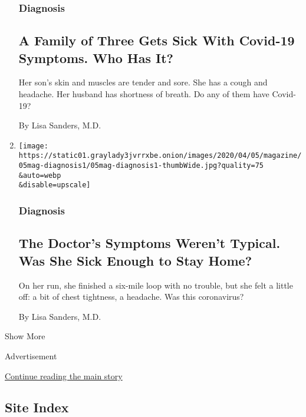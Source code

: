 \begin{enumerate}
{  \subsubsection{Diagnosis}\label{diagnosis-8}}

  \hypertarget{a-family-of-three-gets-sick-with-covid-19-symptoms-who-has-it}{%
  \subsection{A Family of Three Gets Sick With Covid-19 Symptoms. Who
  Has
  It?}\label{a-family-of-three-gets-sick-with-covid-19-symptoms-who-has-it}}

  Her son's skin and muscles are tender and sore. She has a cough and
  headache. Her husband has shortness of breath. Do any of them have
  Covid-19?

  By Lisa Sanders, M.D.
\item
  \href{/2020/03/30/magazine/covid-19-symptoms-doctor.html}{}

  \texttt{[image: https://static01.graylady3jvrrxbe.onion/images/2020/04/05/magazine/05mag-diagnosis1/05mag-diagnosis1-thumbWide.jpg?quality=75\\\&auto=webp\\\&disable=upscale]}

  \hypertarget{diagnosis-9}{%
  \subsubsection{Diagnosis}\label{diagnosis-9}}

  \hypertarget{the-doctors-symptoms-werent-typical-was-she-sick-enough-to-stay-home}{%
  \subsection{The Doctor's Symptoms Weren't Typical. Was She Sick Enough
  to Stay
  Home?}\label{the-doctors-symptoms-werent-typical-was-she-sick-enough-to-stay-home}}

  On her run, she finished a six-mile loop with no trouble, but she felt
  a little off: a bit of chest tightness, a headache. Was this
  coronavirus?

  By Lisa Sanders, M.D.
\end{enumerate}

Show More

Advertisement

\protect\hyperlink{after-mid2}{Continue reading the main story}

\hypertarget{site-index}{%
\subsection{Site Index}\label{site-index}}

